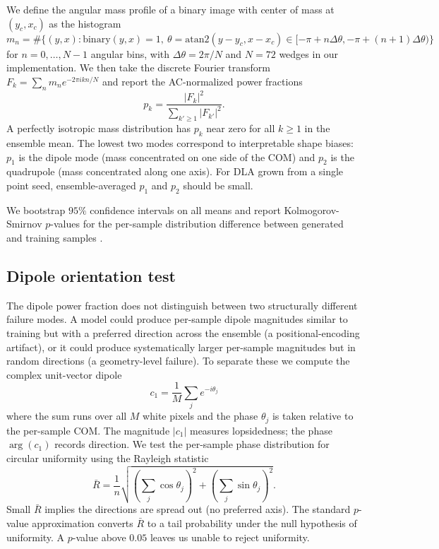 \documentclass[11pt]{article}
\begin{document}
We define the angular mass profile of a binary image with center of mass at $(y_c, x_c)$ as the histogram
\begin{equation}
m_n = \#\bigl\{ (y, x) : \mathrm{binary}(y, x) = 1, \ \theta = \mathrm{atan2}(y - y_c, x - x_c) \in [-\pi + n \Delta\theta, -\pi + (n+1)\Delta\theta) \bigr\}
\end{equation}
for $n = 0, \dots, N-1$ angular bins, with $\Delta\theta = 2\pi / N$ and $N = 72$ wedges in our implementation. We then take the discrete Fourier transform $F_k = \sum_n m_n e^{-2\pi i k n / N}$ and report the AC-normalized power fractions
\begin{equation}
p_k = \frac{|F_k|^2}{\sum_{k' \geq 1} |F_{k'}|^2}.
\end{equation}
A perfectly isotropic mass distribution has $p_k$ near zero for all $k \geq 1$ in the ensemble mean. The lowest two modes correspond to interpretable shape biases: $p_1$ is the dipole mode (mass concentrated on one side of the COM) and $p_2$ is the quadrupole (mass concentrated along one axis). For DLA grown from a single point seed, ensemble-averaged $p_1$ and $p_2$ should be small.

We bootstrap $95\%$ confidence intervals on all means and report Kolmogorov-Smirnov $p$-values for the per-sample distribution difference between generated and training samples \cite{massey1951ks}.

\subsection{Dipole orientation test}

The dipole power fraction does not distinguish between two structurally different failure modes. A model could produce per-sample dipole magnitudes similar to training but with a preferred direction across the ensemble (a positional-encoding artifact), or it could produce systematically larger per-sample magnitudes but in random directions (a geometry-level failure). To separate these we compute the complex unit-vector dipole
\begin{equation}
c_1 = \frac{1}{M} \sum_j e^{-i \theta_j}
\end{equation}
where the sum runs over all $M$ white pixels and the phase $\theta_j$ is taken relative to the per-sample COM. The magnitude $|c_1|$ measures lopsidedness; the phase $\arg(c_1)$ records direction. We test the per-sample phase distribution for circular uniformity using the Rayleigh statistic
\begin{equation}
\bar R = \frac{1}{n} \sqrt{\left( \sum_j \cos \theta_j \right)^2 + \left( \sum_j \sin \theta_j \right)^2}.
\end{equation}
Small $\bar R$ implies the directions are spread out (no preferred axis). The standard $p$-value approximation \cite{fisher1995statistical} converts $\bar R$ to a tail probability under the null hypothesis of uniformity. A $p$-value above $0.05$ leaves us unable to reject uniformity.
\end{document}
